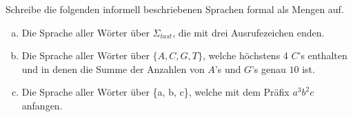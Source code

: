 %
%
Schreibe die folgenden informell beschriebenen Sprachen formal als Mengen auf.


\begin{enumerate}[(a)]
    \item Die Sprache aller Wörter über \(\Sigma_{tast}\), die mit drei Ausrufezeichen enden.\\
    {

    \blank[width=\linewidth]{}}

    \item Die Sprache aller Wörter über \(\{A, C, G, T\}\), welche höchstens 4 \(C\)'s enthalten und in denen die Summe der Anzahlen von \(A\)'s und \(G\)'s genau \(10\) ist. \\
    {

    \blank[width=\linewidth]{}}

    \item Die Sprache aller Wörter über \{a, b, c\}, welche mit dem Präfix \(a^3 b^2 c\) anfangen. \\
    {

    \blank[width=\linewidth]{}}
\end{enumerate}
